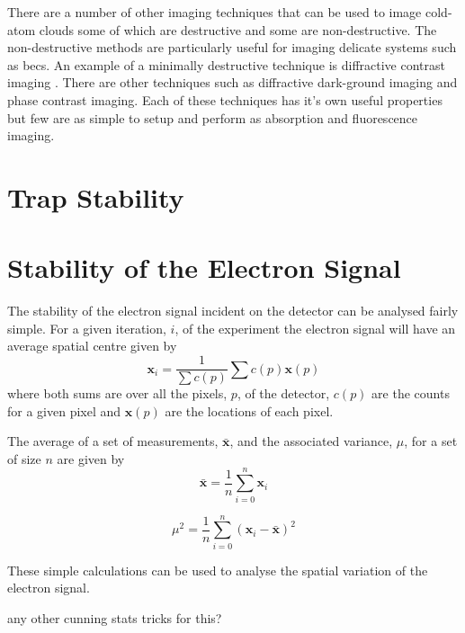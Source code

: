 There are a number of other imaging techniques that can be used to image cold-atom clouds some of which are destructive and some are non-destructive. The non-destructive methods are particularly useful for imaging delicate systems such as \glspl{bec}. An example of a minimally destructive technique is diffractive contrast imaging \cite{sheludko_excited-state_2007}. There are other techniques such as diffractive dark-ground imaging\cite{gregory-orfeus_diffractive_2011} and phase contrast imaging\cite{andrews_propagation_1997}. Each of these techniques has it's own useful properties but few are as simple to setup and perform as absorption and fluorescence imaging.


\section{Trap Stability}

\section{Stability of the Electron Signal}

The stability of the electron signal incident on the detector can be analysed fairly simple. For a given iteration, $i$, of the experiment the electron signal will have an average spatial centre given by
\begin{equation}\label{eq:weight_average_spatial}
\boldsymbol{x}_i = \frac{1}{\sum c(p)} \sum c(p) \boldsymbol x(p)
\end{equation}
where both sums are over all the pixels, $p$, of the detector, $c(p)$ are the counts for a given pixel and $\boldsymbol x(p)$ are the locations of each pixel.

The average of a set of measurements, $\bar{\boldsymbol{x}}$, and the associated variance, $\mu$, for a set of size $n$ are given by
\begin{equation}\label{eq:average_spatial}
\bar{\boldsymbol{x}} = \frac{1}{n} \sum_{i=0}^{n} \boldsymbol{x}_i
\end{equation}

\begin{equation}\label{eq:variance}
\mu^2 = \frac{1}{n} \sum_{i=0}^{n} (\boldsymbol{x}_i - \bar{\boldsymbol{x}})^2
\end{equation}

These simple calculations can be used to analyse the spatial variation of the electron signal.

{\color{red} any other cunning stats tricks for this?}

